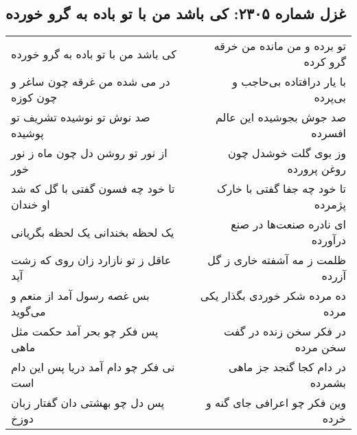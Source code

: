 \begin{center}
\section*{غزل شماره ۲۳۰۵: کی باشد من با تو باده به گرو خورده}
\label{sec:2305}
\begin{longtable}{l p{0.5cm} r}
کی باشد من با تو باده به گرو خورده
&&
تو برده و من مانده من خرقه گرو کرده
\\
در می شده من غرقه چون ساغر و چون کوزه
&&
با یار درافتاده بی‌حاجب و بی‌پرده
\\
صد نوش تو نوشیده تشریف تو پوشیده
&&
صد جوش بجوشیده این عالم افسرده
\\
از نور تو روشن دل چون ماه ز نور خور
&&
وز بوی گلت خوشدل چون روغن پرورده
\\
تا خود چه فسون گفتی با گل که شد او خندان
&&
تا خود چه جفا گفتی با خارک پژمرده
\\
یک لحظه بخندانی یک لحظه بگریانی
&&
ای نادره صنعت‌ها در صنع درآورده
\\
عاقل ز تو نازارد زان روی که زشت آید
&&
ظلمت ز مه آشفته خاری ز گل آزرده
\\
بس غصه رسول آمد از منعم و می‌گوید
&&
ده مرده شکر خوردی بگذار یکی مرده
\\
پس فکر چو بحر آمد حکمت مثل ماهی
&&
در فکر سخن زنده در گفت سخن مرده
\\
نی فکر چو دام آمد دریا پس این دام است
&&
در دام کجا گنجد جز ماهی بشمرده
\\
پس دل چو بهشتی دان گفتار زبان دوزخ
&&
وین فکر چو اعرافی جای گنه و خرده
\\
\end{longtable}
\end{center}

